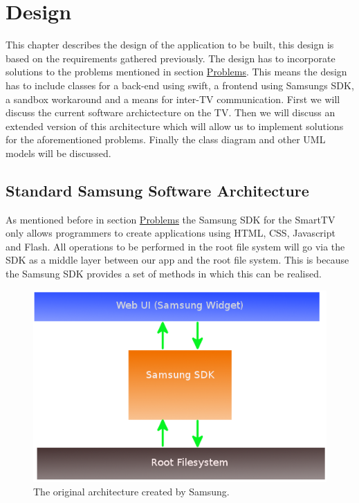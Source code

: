 \chapter{Design}
This chapter describes the design of the application to be built, this design is based on the requirements gathered previously. The design has to
incorporate solutions to the problems mentioned in section \hyperref[sec:problems]{Problems}.
This means the design has to include classes for a back-end using swift, a frontend using Samsung\textquotesingle s SDK, a sandbox workaround and a
 means for inter-TV communication. First we will discuss the current software archictecture on the TV. Then we will discuss an extended version of
 this architecture which will allow us to implement solutions for the aforementioned problems. Finally the class diagram and other UML models will be discussed.

\section{Standard Samsung Software Architecture}
As mentioned before in section \hyperref[sec:problems]{Problems}
the Samsung SDK for the SmartTV only allows programmers to create applications using HTML, CSS, Javascript and Flash.
All operations to be performed in the root file system will go via the SDK as a middle layer between our app and the root file system. This is
because the Samsung SDK provides a set of methods in which this can be realised.

\begin{center}
\begin{figure}[h]
	\centering
	\mbox{\includegraphics[width=1\textwidth]{Images/original_architecture.png}}
	\caption{The original architecture created by Samsung.}
	\label{fig:original_architecture}
\end{figure}
\end{center}

